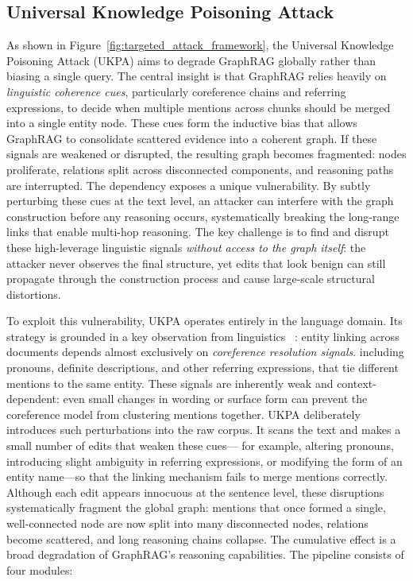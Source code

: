 \documentclass[letterpaper]{article} %
\begin{document}



\subsection{Universal Knowledge Poisoning Attack}
As shown in Figure~\ref{fig:targeted_attack_framework},
the Universal Knowledge Poisoning Attack (UKPA) aims to degrade GraphRAG globally rather than biasing a single query.
The central insight is that GraphRAG relies heavily on \emph{linguistic coherence cues}, particularly
coreference chains and referring expressions, to decide when multiple mentions across chunks
should be merged into a single entity node. These cues form the inductive bias that allows
GraphRAG to consolidate scattered evidence into a coherent graph. 
If these signals are weakened or disrupted, the resulting graph becomes fragmented:
nodes proliferate, relations split across disconnected components, and reasoning paths are interrupted. The dependency exposes a unique vulnerability.
By subtly perturbing these cues at the text level, an attacker can interfere with the graph construction
before any reasoning occurs, systematically breaking the long-range links that enable multi-hop reasoning.
The key challenge is to find and disrupt these high-leverage linguistic signals \emph{without access to the graph itself}:
the attacker never observes the final structure, yet edits that look benign can still propagate
through the construction process and cause large-scale structural distortions.

To exploit this vulnerability, UKPA operates entirely in the language domain. 
Its strategy is grounded in a key observation from linguistics ~\cite{hobbs1978resolving,DBLP:conf/emnlp/LeeHLZ17,DBLP:conf/naacl/LeeHZ18}: 
entity linking across documents depends almost exclusively on \emph{coreference resolution signals}.  
including pronouns, definite descriptions, and other referring expressions, that tie different mentions to the same entity. 
These signals are inherently weak and context-dependent: even small changes in wording or surface form can prevent 
the coreference model from clustering mentions together. UKPA deliberately introduces such perturbations into the raw corpus. 
It scans the text and makes a small number of edits that weaken these cues—
for example, altering pronouns, introducing slight ambiguity in referring expressions, 
or modifying the form of an entity name—so that the linking mechanism fails to merge mentions correctly. 
Although each edit appears innocuous at the sentence level, these disruptions systematically fragment the global graph: 
mentions that once formed a single, well-connected node are now split into many disconnected nodes, 
relations become scattered, and long reasoning chains collapse. 
The cumulative effect is a broad degradation of GraphRAG’s reasoning capabilities. 
The pipeline consists of four modules:
\end{document}
